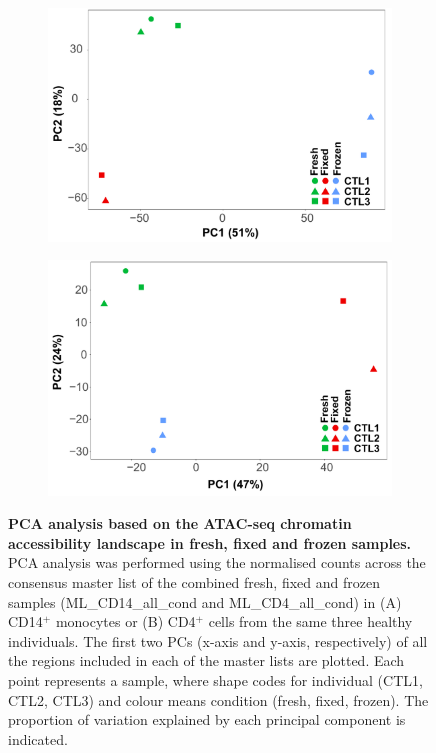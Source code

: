 \begin{figure}[htbp]
\centering
\begin{subfigure}{0.5\textwidth}
\centering
\includegraphics[width=\textwidth]{./Results1/pdfs/Core_ATAC_CD14_fresh_frozen_fixed_no_CTL1_fixed_PCA}
\caption{\textbf{}}
\end{subfigure}%
\begin{subfigure}{0.5\textwidth}
\centering
\includegraphics[width=\textwidth]{./Results1/pdfs/Core_ATAC_CD4_fresh_frozen_fixed_no_CTL1_fixed_PCA}
\caption{\textbf{}}
\end{subfigure}
\caption[PCA analysis based on the ATAC-seq chromatin accessibility landscape in fresh, fixed and frozen samples.]{\textbf{PCA analysis based on the ATAC-seq chromatin accessibility landscape in fresh, fixed and frozen samples.} PCA analysis was performed using the normalised counts across the consensus master list of the combined fresh, fixed and frozen samples (ML\_CD14\_all\_cond and ML\_CD4\_all\_cond) in (A) CD14$^+$ monocytes or (B) CD4$^+$ cells from the same three healthy individuals. The first two PCs (x-axis and y-axis, respectively) of all the regions included in each of the master lists are plotted. Each point represents a sample, where shape codes for individual (CTL1, CTL2, CTL3) and colour means condition (fresh, fixed, frozen). The proportion of variation explained by each principal component is indicated.}
\label{figure:Core_ATAC_all_conditions_PCA}
\end{figure}



